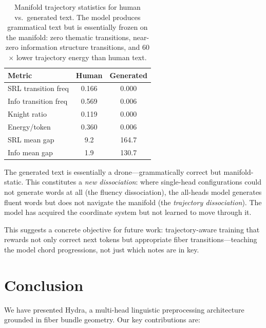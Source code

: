 \documentclass[11pt]{article}
\begin{document}
\begin{table}[t]
\centering
\small
\begin{tabular}{@{}lcc@{}}
\toprule
\textbf{Metric} & \textbf{Human} & \textbf{Generated} \\
\midrule
SRL transition freq & 0.166 & 0.000 \\
Info transition freq & 0.569 & 0.006 \\
Knight ratio & 0.119 & 0.000 \\
Energy/token & 0.360 & 0.006 \\
SRL mean gap & 9.2 & 164.7 \\
Info mean gap & 1.9 & 130.7 \\
\bottomrule
\end{tabular}
\caption{Manifold trajectory statistics for human vs.\ generated text. 
The model produces grammatical text but is essentially frozen on the 
manifold: zero thematic transitions, near-zero information structure 
transitions, and 60$\times$ lower trajectory energy than human text.}
\label{tab:trajectory}
\end{table}

The generated text is essentially a drone---grammatically correct but 
manifold-static. This constitutes a \emph{new dissociation}: where 
single-head configurations could not generate words at all (the fluency 
dissociation), the all-heads model generates fluent words but does not 
navigate the manifold (the \emph{trajectory dissociation}). The model 
has acquired the coordinate system but not learned to move through it.

This suggests a concrete objective for future work: trajectory-aware 
training that rewards not only correct next tokens but appropriate 
fiber transitions---teaching the model chord progressions, not just 
which notes are in key.

\section{Conclusion}
\label{sec:conclusion}

We have presented Hydra, a multi-head linguistic preprocessing architecture 
grounded in fiber bundle geometry. Our key contributions are:
\end{document}
